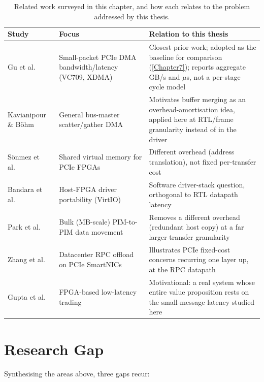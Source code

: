 \begin{table}[htbp]
\centering
\begin{tabular}{@{}p{2.6cm}p{3.4cm}p{4.6cm}@{}}
\toprule
\textbf{Study} & \textbf{Focus} & \textbf{Relation to this thesis} \\
\midrule
Gu et al.~\cite{gu2025cooptimization} & Small-packet PCIe DMA bandwidth/latency (VC709, XDMA) & Closest prior work; adopted as the baseline for comparison (\autoref{Chapter7}); reports aggregate GB/s and $\mu$s, not a per-stage cycle model \\
Kavianipour \& B{\"o}hm~\cite{kavianipour2012high} & General bus-master scatter/gather DMA & Motivates buffer merging as an overhead-amortisation idea, applied here at RTL/frame granularity instead of in the driver \\
S{\"o}nmez et al.~\cite{sonmez2024fleximem} & Shared virtual memory for PCIe FPGAs & Different overhead (address translation), not fixed per-transfer cost \\
Bandara et al.~\cite{bandara2024performance} & Host-FPGA driver portability (VirtIO) & Software driver-stack question, orthogonal to RTL datapath latency \\
Park et al.~\cite{park2024low} & Bulk (MB-scale) PIM-to-PIM data movement & Removes a different overhead (redundant host copy) at a far larger transfer granularity \\
Zhang et al.~\cite{zhang2025rpcnic} & Datacenter RPC offload on PCIe SmartNICs & Illustrates PCIe fixed-cost concerns recurring one layer up, at the RPC datapath \\
Gupta et al.~\cite{gupta2024fpga} & FPGA-based low-latency trading & Motivational: a real system whose entire value proposition rests on the small-message latency studied here \\
\bottomrule
\end{tabular}
\caption{Related work surveyed in this chapter, and how each relates to the problem addressed by this thesis.}
\label{tab:related_work}
\end{table}

\section{Research Gap}
\label{sec:ch2_gap}

Synthesising the areas above, three gaps recur:


